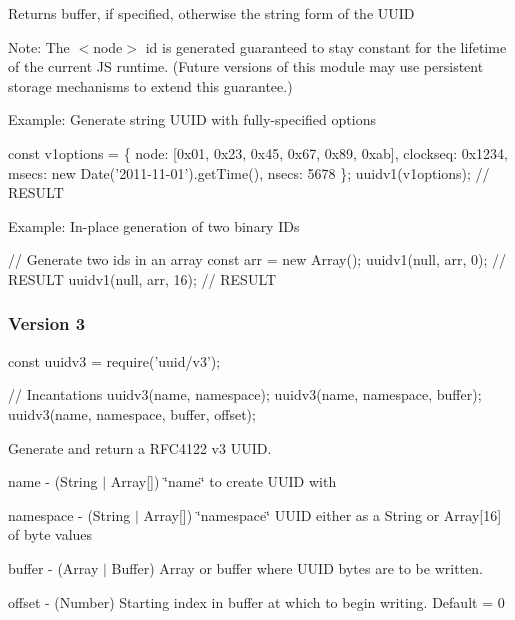 Returns {\ttfamily buffer}, if specified, otherwise the string form of the U\+U\+ID

Note\+: The $<$node$>$ id is generated guaranteed to stay constant for the lifetime of the current JS runtime. (Future versions of this module may use persistent storage mechanisms to extend this guarantee.)

Example\+: Generate string U\+U\+ID with fully-\/specified options


\begin{DoxyCode}
const v1options = \{
  node: [0x01, 0x23, 0x45, 0x67, 0x89, 0xab],
  clockseq: 0x1234,
  msecs: new Date('2011-11-01').getTime(),
  nsecs: 5678
\};
uuidv1(v1options); // RESULT
\end{DoxyCode}


Example\+: In-\/place generation of two binary I\+Ds


\begin{DoxyCode}
// Generate two ids in an array
const arr = new Array();
uuidv1(null, arr, 0);  // RESULT
uuidv1(null, arr, 16); // RESULT
\end{DoxyCode}


\subsubsection*{Version 3}


\begin{DoxyCode}
const uuidv3 = require('uuid/v3');

// Incantations
uuidv3(name, namespace);
uuidv3(name, namespace, buffer);
uuidv3(name, namespace, buffer, offset);
\end{DoxyCode}


Generate and return a R\+F\+C4122 v3 U\+U\+ID.


\begin{DoxyItemize}
\item {\ttfamily name} -\/ (String $\vert$ Array\mbox{[}\mbox{]}) \char`\"{}name\char`\"{} to create U\+U\+ID with
\item {\ttfamily namespace} -\/ (String $\vert$ Array\mbox{[}\mbox{]}) \char`\"{}namespace\char`\"{} U\+U\+ID either as a String or Array\mbox{[}16\mbox{]} of byte values
\item {\ttfamily buffer} -\/ (Array $\vert$ Buffer) Array or buffer where U\+U\+ID bytes are to be written.
\item {\ttfamily offset} -\/ (Number) Starting index in {\ttfamily buffer} at which to begin writing. Default = 0
\end{DoxyItemize}

